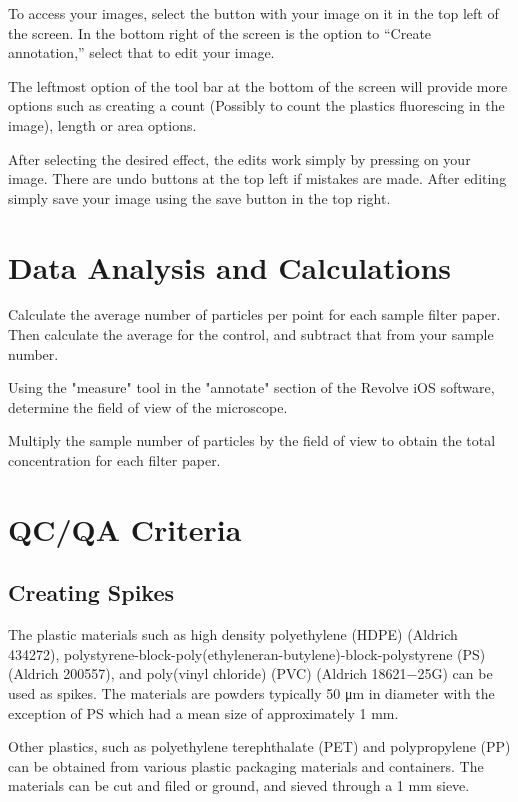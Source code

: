 \documentclass[12pt]{../SOP4_alpha}\usepackage[]{graphicx}\usepackage[]{color}
\begin{document}
\NP To access your images, select the button with your image on it in the top left of the screen. In the bottom right of the screen is the option to ``Create annotation,'' select that to edit your image. 

\NP The leftmost option of the tool bar at the bottom of the screen will provide more options such as creating a count (Possibly to count the plastics fluorescing in the image), length or area options. 

\NP After selecting the desired effect, the edits work  simply by pressing on your image. There are undo buttons at the top left if mistakes are made. After editing simply save your image using the save button in the top right.

\section{Data Analysis and Calculations}

  \NP Calculate the average number of particles per point for each sample filter paper. Then calculate the average for the control, and subtract that from your sample number.

  \NP Using the "measure" tool in the "annotate" section of the Revolve iOS software, determine the field of view of the microscope.

  \NP Multiply the sample number of particles by the field of view to obtain the total concentration for each filter paper.
  


\section{QC/QA Criteria}

\subsection{Creating Spikes}

\NP The plastic materials such as high density polyethylene (HDPE) (Aldrich 434272),
polystyrene-block-poly(ethyleneran-butylene)-block-polystyrene (PS) 
(Aldrich 200557), and poly(vinyl chloride) (PVC) (Aldrich 18621−25G) can
be used as spikes. The materials are powders typically 50 μm in diameter with the
exception of PS which had a mean size of approximately 1 mm.

\NP Other plastics, such as polyethylene terephthalate (PET) and
polypropylene (PP) can be obtained from various plastic
packaging materials and containers. The materials can be cut and
filed or ground, and sieved through a 1 mm sieve. 
\end{document}
